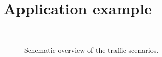 \section{Application example}

\begin{figure}
	\centering
	\setlength\figureheight{100pt}
	\setlength\figurewidth{260pt}
	\\
	\caption{Schematic overview of the traffic scenarios.}
\end{figure}
